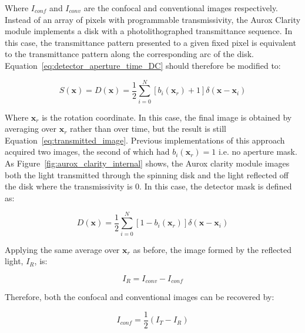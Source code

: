Where $I_{conf}$ and $I_{conv}$ are the confocal and 
conventional images respectively. Instead of an array of 
pixels with programmable transmissivity, the Aurox Clarity 
module implements a disk with a photolithographed 
transmittance sequence. In this case, the transmittance 
pattern presented to a given fixed pixel is equivalent to 
the transmittance pattern along the corresponding arc of 
the disk\cite{wilson1996confocal}. 
Equation~\ref{eq:detector_aperture_time_DC} should therefore 
be modified to:

\begin{equation}\label{eq:detector_aperture_arc}
S\left(\textbf{x}\right) = D\left(\textbf{x}\right) = \frac{1}{2} \sum_{i=0}^{N} \left[b_{i}\left(\textbf{x}_{r}\right) + 1\right]\delta\left(\textbf{x} - \textbf{x}_{i}\right)
\end{equation}

Where $\textbf{x}_{r}$ is the rotation coordinate. In 
this case, the final image is obtained by averaging over 
$\textbf{x}_{r}$ rather than over time, but the result is 
still Equation~\ref{eq:transmitted_image}. Previous 
implementations of this approach acquired two images, the 
second of which had $b_{i}\left(\textbf{x}_{r}\right) = 1$ 
i.e. no aperture mask. As Figure~\ref{fig:aurox_clarity_internal} 
shows, the Aurox clarity module images both the light 
transmitted through the spinning disk and the light 
reflected off the disk where the transmissivity is $0$. In 
this case, the detector mask is defined as:

\begin{equation}\label{eq:detector_aperture_arc_reflect}
D\left(\textbf{x}\right) = \frac{1}{2} \sum_{i=0}^{N} \left[1 - b_{i}\left(\textbf{x}_{r}\right)\right]\delta\left(\textbf{x} - \textbf{x}_{i}\right)
\end{equation}

Applying the same average over $\textbf{x}_{r}$ as before, 
the image formed by the reflected light, $I_{R}$, is:

\begin{equation}\label{eq:reflected_image}
I_{R} = I_{conv} - I_{conf}
\end{equation}

Therefore, both the confocal and conventional images can 
be recovered by:

\begin{equation}\label{eq:confocal_image}
I_{conf} = \frac{1}{2}\left(I_{T} - I_{R}\right)
\end{equation}

